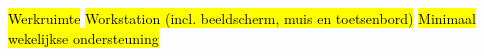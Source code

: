 \begin{outline}
  \1 \hl{Werkruimte}
  \1 \hl{Workstation (incl. beeldscherm, muis en toetsenbord)}
  \1 \hl{Minimaal wekelijkse ondersteuning}
\end{outline}